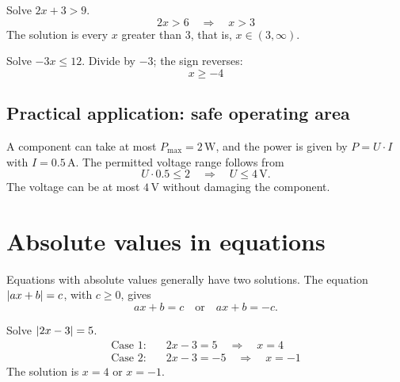 \begin{exempel}
Solve $2x + 3 > 9$.
\[
  2x > 6 \quad \Rightarrow \quad x > 3
\]
The solution is every $x$ greater than $3$, that is, $x \in (3, \infty)$.
\end{exempel}

\begin{exempel}
Solve $-3x \leq 12$. Divide by $-3$; the sign reverses:
\[
  x \geq -4
\]
\end{exempel}

\subsection{Practical application: safe operating area}
\label{c3:sec:driftomrade}
A component can take at most $P_{\max} = 2\,\text{W}$, and the power is given by $P = U \cdot I$
with $I = 0.5\,\text{A}$. The permitted voltage range follows from
\[
  U \cdot 0.5 \leq 2 \quad \Rightarrow \quad U \leq 4\,\text{V}.
\]
The voltage can be at most $4\,\text{V}$ without damaging the component.

\section{Absolute values in equations}
\label{c3:sec:absolutbelopp}
Equations with absolute values generally have two solutions. The equation $\lvert ax + b\rvert = c$,
with $c \geq 0$, gives
\[
  ax + b = c \quad \text{or} \quad ax + b = -c.
\]

\begin{exempel}
Solve $\lvert2x - 3\rvert = 5$.
\begin{align*}
  \text{Case 1:} &\quad 2x - 3 = 5 \quad \Rightarrow \quad x = 4 \\
  \text{Case 2:} &\quad 2x - 3 = -5 \quad \Rightarrow \quad x = -1
\end{align*}
The solution is $x = 4$ or $x = -1$.
\end{exempel}
